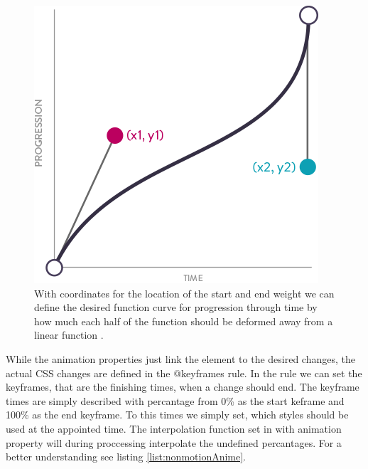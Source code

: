 \begin{figure}[tp]
\centering
\includegraphics[keepaspectratio,width=\hsize,height=\halfh]
{images/cubicBezier.png}

\caption[Cubic-bezier Function]{
With coordinates for the location of the start and end weight we can define the 
desired function curve for progression through time by how much each half of 
the function should be deformed away from a linear function 
\citep{head2016designing}.
}
\label{fig:curve}
\end{figure}

While the animation properties just link the element to the desired changes, 
the actual CSS changes are defined in the @keyframes rule. In the rule we can 
set the keyframes, that are the finishing times, when a change should end. The 
keyframe times are simply described with percantage from 0\% as the start 
keframe and 100\% as the end keyframe. To this times we simply set, which 
styles should be used at the appointed time. The interpolation function set in 
with animation property will during proccessing interpolate the undefined 
percantages. For a better understanding see listing \ref{list:nonmotionAnime}.


